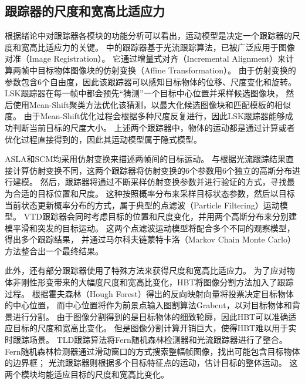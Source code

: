 \subsection{跟踪器的尺度和宽高比适应力}
根据绪论中对跟踪器各模块的功能分析可以看出，运动模型是决定一个跟踪器的尺度和宽高比适应力的关键。
\cite{survey51}中的跟踪器基于光流跟踪算法，已被广泛应用于图像对准（Image Registration）。
它通过增量式对齐（Incremental Alignment）来计算两帧中目标物体图像块的仿射变换（Affine Transformation）。
由于仿射变换的参数包含6个自由度，因此该跟踪器可以感知目标物体的位移、尺度变化和旋转。
LSK跟踪器在每一帧中都会预先``猜测''一个目标中心位置并采样候选图像块，
然后使用Mean-Shift聚类方法优化该猜测，以最大化候选图像块和匹配模板的相似度。
由于Mean-Shift优化过程会根据多种尺度反复进行，因此LSK跟踪器能够成功判断当前目标的尺度大小。
上述两个跟踪器中，物体的运动都是通过计算或者优化过程直接得到的，因此其运动模型属于隐式模型。

ASLA和SCM均采用仿射变换来描述两帧间的目标运动。
与\cite{survey51}根据光流跟踪结果直接计算仿射变换不同，这两个跟踪器将仿射变换的6个参数用6个独立的高斯分布进行建模。
然后，跟踪器将通过不断采样仿射变换参数并进行验证的方式，寻找最为合适的目标位置和尺度。
这种按照概率分布来采样目标状态参数，然后以目标当前状态更新概率分布的方式，属于典型的点滤波（Particle Filtering）运动模型。
VTD跟踪器会同时考虑目标的位置和尺度变化，并用两个高斯分布来分别建模平滑和突发的目标运动。
这两个点滤波运动模型将配合多个不同的观察模型，得出多个跟踪结果，
并通过马尔科夫链蒙特卡洛（Markov Chain Monte Carlo）方法整合出一个最终结果。

此外，还有部分跟踪器使用了特殊方法来获得尺度和宽高比适应力。
为了应对物体非刚性形变带来的大幅度尺度和宽高比变化，HBT将图像分割方法加入了跟踪过程。
根据霍夫森林（Hough Forest）得出的反向映射向量将投票决定目标物体的中心位置，
而中心位置将作为前景点输入图割算法Grabcut，以对目标物体和背景进行分割。
由于图像分割得到的是目标物体的细致轮廓，因此HBT可以准确适应目标的尺度和宽高比变化。
但是图像分割计算开销巨大，使得HBT难以用于实时跟踪场景。
TLD跟踪算法将Fern随机森林检测器和光流跟踪器进行了整合。
Fern随机森林检测器通过滑动窗口的方式搜索整幅帧图像，找出可能包含目标物体的边界框；
光流跟踪器则根据多个目标特征点的运动，估计目标的整体运动。
这两个模块均能适应目标的尺度和宽高比变化。

